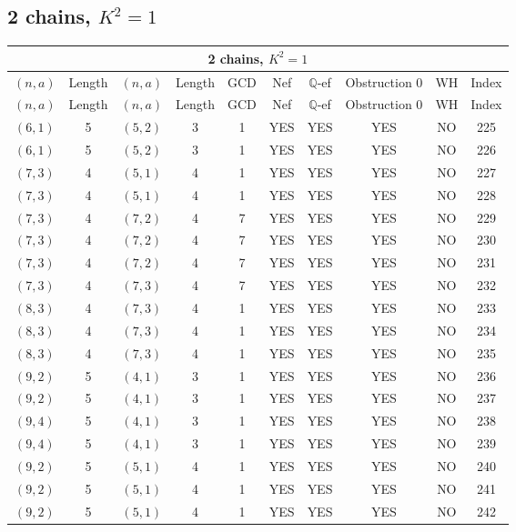 \subsection{2 chains, $K^2 = 1$}
\begin{longtable}{|c|c|c|c|c|c|c|c|c|c|}
\hline
\multicolumn{10}{|c|}{2 chains, $K^2 = 1$}\\
\hline
$(n,a)$ & Length & $(n,a)$ & Length & GCD & Nef & $\mathbb Q$-ef & Obstruction 0 & WH & Index\\
\hline
\endfirsthead

\hline
$(n,a)$ & Length & $(n,a)$ & Length & GCD & Nef & $\mathbb Q$-ef & Obstruction 0 & WH & Index\\
\hline
\endhead
\hline
\endfoot

$(6, 1)$ & 5 & $(5, 2)$ & 3 & 1 & YES & YES & YES & NO & 225\\
$(6, 1)$ & 5 & $(5, 2)$ & 3 & 1 & YES & YES & YES & NO & 226\\
$(7, 3)$ & 4 & $(5, 1)$ & 4 & 1 & YES & YES & YES & NO & 227\\
$(7, 3)$ & 4 & $(5, 1)$ & 4 & 1 & YES & YES & YES & NO & 228\\
$(7, 3)$ & 4 & $(7, 2)$ & 4 & 7 & YES & YES & YES & NO & 229\\
$(7, 3)$ & 4 & $(7, 2)$ & 4 & 7 & YES & YES & YES & NO & 230\\
$(7, 3)$ & 4 & $(7, 2)$ & 4 & 7 & YES & YES & YES & NO & 231\\
$(7, 3)$ & 4 & $(7, 3)$ & 4 & 7 & YES & YES & YES & NO & 232\\
$(8, 3)$ & 4 & $(7, 3)$ & 4 & 1 & YES & YES & YES & NO & 233\\
$(8, 3)$ & 4 & $(7, 3)$ & 4 & 1 & YES & YES & YES & NO & 234\\
$(8, 3)$ & 4 & $(7, 3)$ & 4 & 1 & YES & YES & YES & NO & 235\\
$(9, 2)$ & 5 & $(4, 1)$ & 3 & 1 & YES & YES & YES & NO & 236\\
$(9, 2)$ & 5 & $(4, 1)$ & 3 & 1 & YES & YES & YES & NO & 237\\
$(9, 4)$ & 5 & $(4, 1)$ & 3 & 1 & YES & YES & YES & NO & 238\\
$(9, 4)$ & 5 & $(4, 1)$ & 3 & 1 & YES & YES & YES & NO & 239\\
$(9, 2)$ & 5 & $(5, 1)$ & 4 & 1 & YES & YES & YES & NO & 240\\
$(9, 2)$ & 5 & $(5, 1)$ & 4 & 1 & YES & YES & YES & NO & 241\\
$(9, 2)$ & 5 & $(5, 1)$ & 4 & 1 & YES & YES & YES & NO & 242\\

\end{longtable}
